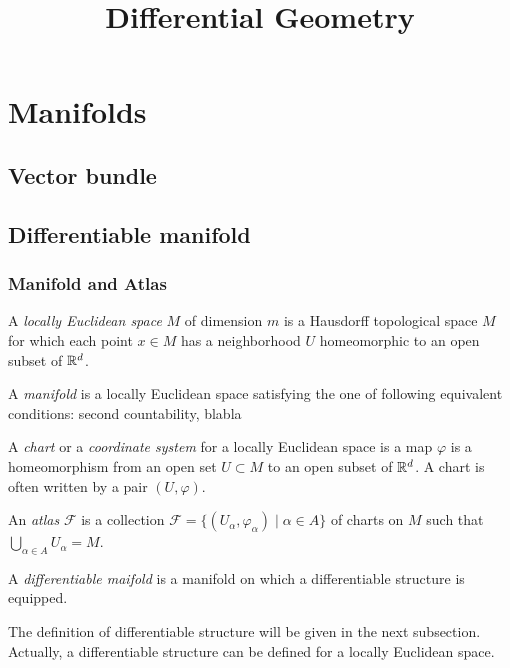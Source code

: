 \documentclass{../crs}
\title{Differential Geometry}
\begin{document}
\maketitle
\tableofcontents

\chapter{Manifolds}

\section{Vector bundle}


\section{Differentiable manifold}

\subsection{Manifold and Atlas}
\begin{defn}
A \emph{locally Euclidean space} $M$ of dimension $m$ is a Hausdorff topological space $M$ for which each point $x\in M$ has a neighborhood $U$ homeomorphic to an open subset of $\Bbb{R}^d$.
\end{defn}
\begin{defn}
A \emph{manifold} is a locally Euclidean space satisfying the one of following equivalent conditions: second countability, blabla%
\end{defn}

\begin{defn}
A \emph{chart} or a \emph{coordinate system} for a locally Euclidean space is a map $\varphi$ is a homeomorphism from an open set $U\subset M$ to an open subset of $\Bbb{R}^d$.
A chart is often written by a pair $(U,\varphi)$.
\end{defn}

\begin{defn}
An \emph{atlas} $\mathcal{F}$ is a collection $\mathcal{F}=\{(U_\alpha,\varphi_\alpha)\mid\alpha\in A\}$ of charts on $M$ such that $\bigcup_{\alpha\in A} U_\alpha=M$.
\end{defn}


\begin{defn}
A \emph{differentiable maifold} is a manifold on which a differentiable structure is equipped.
\end{defn}
The definition of differentiable structure will be given in the next subsection.
Actually, a differentiable structure can be defined for a locally Euclidean space.
\end{document}
